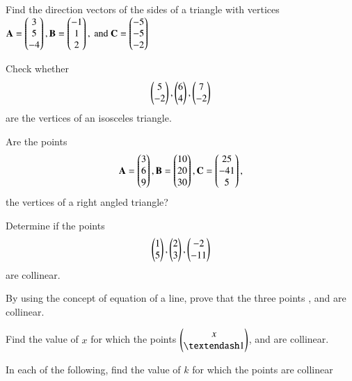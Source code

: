 \item Find the direction vectors of the sides of a triangle with vertices
$
\mathbf{A} = \begin{pmatrix}3\\5 \\-4\end{pmatrix},
\mathbf{B} = \begin{pmatrix}-1\\1 \\2\end{pmatrix}, \text{ and }
\mathbf{C} = \begin{pmatrix}-5\\ -5\\-2\end{pmatrix}
$
\item Check whether 
\begin{align}
\begin{pmatrix}5\\-2\end{pmatrix}, \begin{pmatrix}6\\4\end{pmatrix}, \begin{pmatrix}7\\-2\end{pmatrix}
\end{align}
are the vertices of an isosceles triangle.
%
 \item Are the points 
\begin{align}
\mathbf{A} = \begin{pmatrix}3\\6 \\9\end{pmatrix},
\mathbf{B} = \begin{pmatrix}10\\20 \\30\end{pmatrix},
\mathbf{C} = \begin{pmatrix}25\\ -41\\5\end{pmatrix},
\end{align}
%
the vertices of a right angled triangle?
\item Determine if the points 
\begin{align}
\begin{pmatrix}1\\5\end{pmatrix}, \begin{pmatrix}2\\3\end{pmatrix}, \begin{pmatrix}-2\\-11\end{pmatrix}
\end{align}
%
are collinear.	
\item By using the concept of equation of a line, prove that the three points ,  and  are collinear.
\item Find the value of $x$ for which the points $\myvec{x\\ – 1}$,  and  are collinear.
\item  In each of the following, find the value of $k$ for which the points are collinear

